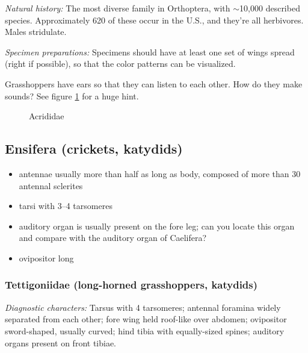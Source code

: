 \noindent{}\textit{Natural history:} The most diverse family in Orthoptera, with $\sim$10,000 described species. Approximately 620 of these occur in the U.S., and they're all herbivores. Males stridulate.\vspace{3mm}

\noindent{}\textit{Specimen preparations:} Specimens should have at least one set of wings spread (right if possible), so that the color patterns can be visualized.\vspace{3mm}%

\begin{theo}
{}Grasshoppers have ears so that they can listen to each other. How do they make sounds? See figure \ref{fig:acrididhabitus} for a huge hint.
\end{theo}

\begin{figure}[ht!]
  \centering
  \caption{Acrididae \citep[modified from][Fig. 16]{bhl128276}}
  \label{fig:acrididhabitus}
\end{figure}

\subsection{Ensifera (crickets, katydids)}
\begin{itemize}
\item antennae usually more than half as long as body, composed of more than 30 antennal sclerites
\item tarsi with 3--4 tarsomeres
\item auditory organ is usually present on the fore leg; can you locate this organ and compare with the auditory organ of Caelifera?
\item ovipositor long
\end{itemize}

\subsubsection{Tettigoniidae (long-horned grasshoppers, katydids)}
\noindent{}\textit{Diagnostic characters:} Tarsus with 4 tarsomeres; antennal foramina widely separated from each other; fore wing held roof-like over abdomen; ovipositor sword-shaped, usually curved; hind tibia with equally-sized spines; auditory organs present on front tibiae.\vspace{3mm}

